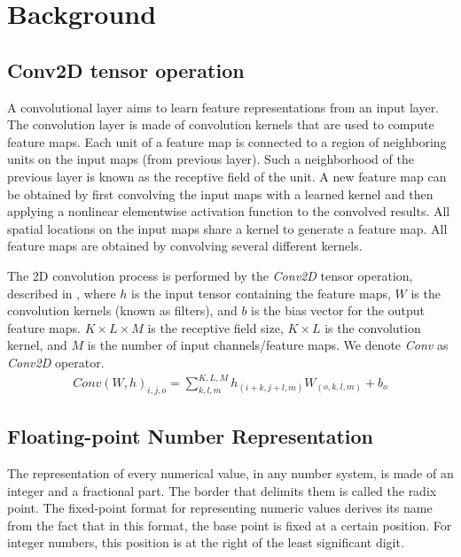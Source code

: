 \section{Background}
\label{sec:background}

\subsection{Conv2D tensor operation}
A convolutional layer aims to learn feature representations from an input layer. The convolution layer is made of convolution kernels that are used to compute feature maps. Each unit of a feature map is connected to a region of neighboring units on the input maps (from previous layer). Such a neighborhood of the previous layer is known as the receptive field of the unit. A new feature map can be obtained by first convolving the input maps with a learned kernel and then applying a nonlinear elementwise activation function to the convolved results. All spatial locations on the input maps share a kernel to generate a feature map. All feature maps are obtained by convolving several different kernels\cite{gu2018recent}.


The 2D convolution process is performed by the \emph{Conv2D} tensor operation, described in , where $h$ is the input tensor containing the feature maps, $W$ is the convolution kernels (known as filters), and $b$ is the bias vector for the output feature maps\cite{goodfellow2016deep}. $K\times L\times M$ is the receptive field size, $K\times L$ is the convolution kernel, and $M$ is the number of input channels/feature maps. We denote \emph{Conv} as \emph{Conv2D} operator.
\begin{eqnarray} \label{eq:conv2D}
Conv\left(W,h\right)_{i,j,o}=\sum_{k,l,m}^{K,L,M} h_{(i+k,j+l,m)} W_{(o,k,l,m)}+b_{o}
\end{eqnarray}

\subsection{Floating-point Number Representation}
The representation of every numerical value, in any number system, is made of an integer and a fractional part. The border that delimits them is called the radix point. The fixed-point format for representing numeric values derives its name from the fact that in this format, the base point is fixed at a certain position. For integer numbers, this position is at the right of the least significant digit.


